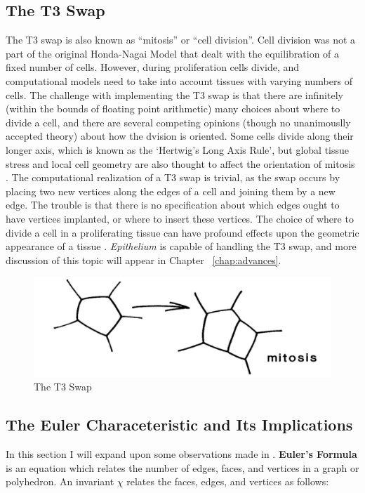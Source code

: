 \subsection{The T3 Swap}
The T3 swap is also known as ``mitosis'' or ``cell division''. Cell division was not a part of the original Honda-Nagai Model \cite{HondaNagai} that dealt with the equilibration of a fixed number of cells. However, during proliferation cells divide, and computational models need to take into account tissues with varying numbers of cells. The challenge with implementing the T3 swap is that there are infinitely (within the bounds of floating point arithmetic) many choices about where to divide a cell, and there are several competing opinions (though no unanimouslly accepted theory) about how the dvision is oriented. Some cells divide along their longer axis, which is known as the `Hertwig's Long Axis Rule', but global tissue stress and local cell geometry are also thought to affect the orientation of mitosis \cite{Order}\cite{Orientation}. The computational realization of a T3 swap is trivial, as the swap occurs by placing two new vertices along the edges of a cell and joining them by a new edge. The trouble is that there is no specification about which edges ought to have vertices implanted, or where to insert these vertices. The choice of where to divide a cell in a proliferating tissue can have profound effects upon the geometric appearance of a tissue \cite{EpithelialTopology}. \emph{Epithelium} is capable of handling the T3 swap, and more discussion of this topic will appear in Chapter ~\ref{chap:advances}.
\begin{figure}
\centering
\includegraphics[width=\textwidth]{../diagrams/t3.png}
\caption{The T3 Swap}
\label{fig:t3}
\end{figure}

\subsection{The Euler Characeteristic and Its Implications}
In this section I will expand upon some observations made in \cite{Soap}. \textbf{Euler's Formula} is an equation which relates the number of edges, faces, and vertices in a graph or polyhedron. An invariant $\chi$ relates the faces, edges, and vertices as follows:

